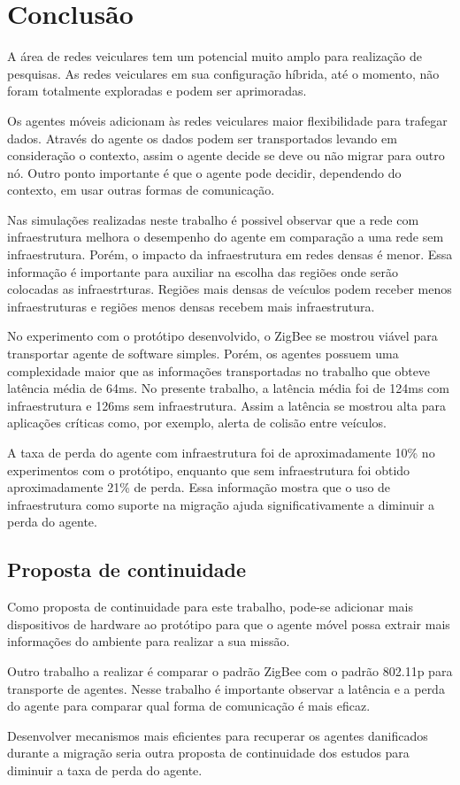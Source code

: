 \section{Conclusão}

A área de redes veiculares tem um potencial muito amplo para realização de pesquisas.  As redes veiculares em sua configuração híbrida, até o momento, não foram totalmente exploradas e podem ser aprimoradas.

Os agentes móveis adicionam às redes veiculares maior flexibilidade para trafegar dados. Através do agente os dados podem ser transportados levando em consideração o contexto, assim o agente decide se deve ou não migrar para outro nó. Outro ponto importante é que o agente pode decidir, dependendo do contexto, em usar outras formas de comunicação. 

Nas simulações realizadas neste trabalho é possivel observar que a rede com infraestrutura melhora o desempenho do agente em comparação a uma rede sem infraestrutura. Porém, o impacto da infraestrutura em redes densas é menor. Essa informação é importante para auxiliar na escolha das regiões onde serão colocadas as infraestrturas. Regiões mais densas de veículos podem receber menos infraestruturas e regiões menos densas recebem mais infraestrutura. 

No experimento com o protótipo desenvolvido, o ZigBee se mostrou viável para transportar agente de software simples. Porém, os agentes possuem uma complexidade maior que as informações transportadas no trabalho \cite{santanaMestrado:2014} que obteve latência média de 64ms. No presente trabalho, a latência média foi de 124ms com infraestrutura e 126ms sem infraestrutura. Assim a latência se mostrou alta para aplicações críticas como, por exemplo, alerta de colisão entre veículos.

A taxa de perda do agente com infraestrutura foi de aproximadamente 10\% no experimentos com o protótipo, enquanto que sem infraestrutura foi obtido aproximadamente 21\% de perda. Essa informação mostra que o uso de infraestrutura como suporte na migração ajuda significativamente a diminuir a perda do agente.


\subsection{Proposta de continuidade}
Como proposta de continuidade para este trabalho, pode-se adicionar mais dispositivos de hardware ao protótipo para que o agente móvel possa extrair mais informações do ambiente para realizar a sua missão.

Outro trabalho a realizar é comparar o padrão ZigBee com o padrão 802.11p para transporte de agentes. Nesse trabalho é importante observar a latência e a perda do agente para comparar qual forma de comunicação é mais eficaz.

Desenvolver mecanismos mais eficientes para recuperar os agentes danificados durante a migração seria outra proposta de continuidade dos estudos para diminuir a taxa de perda do agente. 
